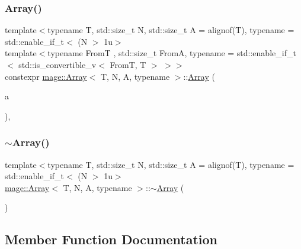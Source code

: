 \subsubsection{\texorpdfstring{Array()}{Array()}\hspace{0.1cm}{\footnotesize\ttfamily [10/10]}}
{\footnotesize\ttfamily template$<$typename T, std\+::size\+\_\+t N, std\+::size\+\_\+t A = alignof(\+T), typename  = std\+::enable\+\_\+if\+\_\+t$<$ (\+N $>$ 1u$>$ \\
template$<$typename FromT , std\+::size\+\_\+t FromA, typename  = std\+::enable\+\_\+if\+\_\+t$<$ std\+::is\+\_\+convertible\+\_\+v$<$ From\+T, T $>$ $>$$>$ \\
constexpr \mbox{\hyperlink{structmage_1_1_array}{mage\+::\+Array}}$<$ T, N, A, typename $>$\+::\mbox{\hyperlink{structmage_1_1_array}{Array}} (\begin{DoxyParamCaption}\item[{const \mbox{\hyperlink{structmage_1_1_array}{Array}}$<$ FromT, N, FromA $>$ \&}]{a }\end{DoxyParamCaption})\hspace{0.3cm}{\ttfamily [explicit]}, {\ttfamily [noexcept]}}

\mbox{\label{structmage_1_1_array_a7adc09166915789b93a7a3af118182e0}} 
\subsubsection{\texorpdfstring{$\sim$\+Array()}{~Array()}}
{\footnotesize\ttfamily template$<$typename T, std\+::size\+\_\+t N, std\+::size\+\_\+t A = alignof(\+T), typename  = std\+::enable\+\_\+if\+\_\+t$<$ (\+N $>$ 1u$>$ \\
\mbox{\hyperlink{structmage_1_1_array}{mage\+::\+Array}}$<$ T, N, A, typename $>$\+::$\sim$\mbox{\hyperlink{structmage_1_1_array}{Array}} (\begin{DoxyParamCaption}{ }\end{DoxyParamCaption})\hspace{0.3cm}{\ttfamily [default]}}



\subsection{Member Function Documentation}
\mbox{\label{structmage_1_1_array_a216d8efaf044c3219a45e53073833ee0}} 
